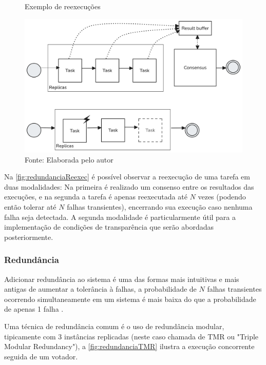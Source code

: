 \begin{figure}[H]
    \centering
    \captionsetup{justification=centering}
    \caption{Exemplo de reexecuções}
    \includegraphics[width=1.0\textwidth]{assets/redundancia_reexec.png}
    \captionsetup{justification=raggedright}
    \caption*{Fonte: Elaborada pelo autor}
    \label{fig:redundanciaReexec}
\end{figure}

Na \autoref{fig:redundanciaReexec} é possível observar a reexecução de uma tarefa em duas modalidades: Na primeira é realizado um consenso entre os resultados das execuções, e na segunda a tarefa é apenas reexecutada até $N$ vezes (podendo então tolerar até $N$ falhas transientes), encerrando sua execução caso nenhuma falha seja detectada. A segunda modalidade é particularmente útil para a implementação de condições de transparência \cite{SchedAndOptOfDistributedFT} que serão abordadas posteriormente.

\subsubsection{Redundância}

Adicionar redundância ao sistema é uma das formas mais intuitivas e mais antigas de aumentar a tolerância à falhas, a probabilidade de $N$ falhas transientes ocorrendo simultaneamente em um sistema é mais baixa do que a probabilidade de apenas 1 falha \cite{SchedAndOptOfDistributedFT}.

Uma técnica de redundância comum é o uso de redundância modular, tipicamente com 3 instâncias replicadas (neste caso chamada de TMR ou "Triple Modular Redundancy"), a \autoref{fig:redundanciaTMR} ilustra a execução concorrente seguida de um votador.

